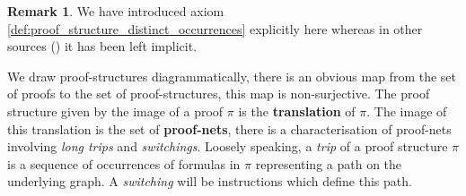 \documentclass[12pt]{article}
\theoremstyle{plain}
\theoremstyle{definition}
\newtheorem{remark}[thm]{Remark}
\begin{document}
\begin{remark}
We have introduced axiom \ref{def:proof_structure_distinct_occurrences} explicitly here whereas in other sources (\cite{linearlogic}) it has been left implicit.
\end{remark}
We draw proof-structures diagrammatically, there is an obvious map from the set of proofs to the set of proof-structures, this map is non-surjective. The proof structure given by the image of a proof $\pi$ is the \textbf{translation} of $\pi$. The image of this translation is the set of \textbf{proof-nets}, there is a characterisation of proof-nets involving \emph{long trips} and \emph{switchings}. Loosely speaking, a \emph{trip} of a proof structure $\pi$ is a sequence of occurrences of formulas in $\pi$ representing a path on the underlying graph. A \emph{switching} will be instructions which define this path.
\end{document}
